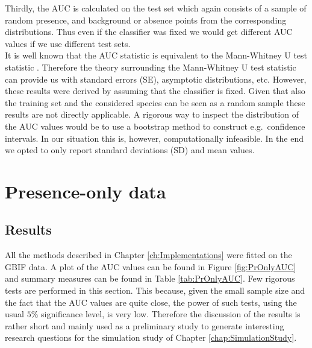 Thirdly, the AUC is calculated on the test set which again consists of a sample of random presence, and background or absence points from the corresponding distributions. Thus even if the classifier was fixed we would get different AUC values if we use different test sets. \\

It is well known that the AUC statistic is equivalent to the Mann-Whitney U test statistic \parencite{hanley_meaning_1982}. Therefore the theory surrounding the Mann-Whitney U test statistic can provide us with standard errors (SE), asymptotic distributions, etc. However, these results were derived by assuming that the classifier is fixed. Given that also the training set and the considered species can be seen as a random sample these results are not directly applicable. A rigorous way to inspect the distribution of the AUC values would be to use a bootstrap method to construct e.g.\ confidence intervals. In our situation this is, however, computationally infeasible. In the end we opted to only report standard deviations (SD) and mean values.\\

\section{Presence-only data}
\label{sec:POData}
\subsection{Results}
All the methods described in Chapter \ref{ch:Implementations} were fitted on the GBIF data. A plot of the AUC values can be found in Figure \ref{fig:PrOnlyAUC} and summary measures can be found in Table \ref{tab:PrOnlyAUC}. Few rigorous tests are performed in this section. This because, given the small sample size and the fact that the AUC values are quite close, the power of such tests, using the usual $5\%$ significance level, is very low. Therefore the discussion of the results is rather short and mainly used as a preliminary study to generate interesting research questions for the simulation study of Chapter \ref{chap:SimulationStudy}. \\


